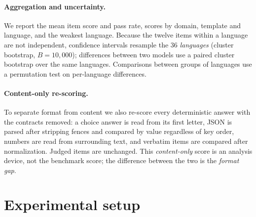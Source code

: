 \documentclass[11pt]{article}
\begin{document}
\paragraph{Aggregation and uncertainty.} We report the mean item score and pass rate, scores by domain, template and language, and the weakest language. Because the twelve items within a language are not independent, confidence intervals resample the 36 \emph{languages} (cluster bootstrap, $B=10{,}000$); differences between two models use a paired cluster bootstrap over the same languages. Comparisons between groups of languages use a permutation test on per-language differences.

\paragraph{Content-only re-scoring.} To separate format from content we also re-score every deterministic answer with the contracts removed: a choice answer is read from its first letter, JSON is parsed after stripping fences and compared by value regardless of key order, numbers are read from surrounding text, and verbatim items are compared after normalization. Judged items are unchanged. This \emph{content-only} score is an analysis device, not the benchmark score; the difference between the two is the \emph{format gap}.

\section{Experimental setup}
\label{sec:setup}
\end{document}
